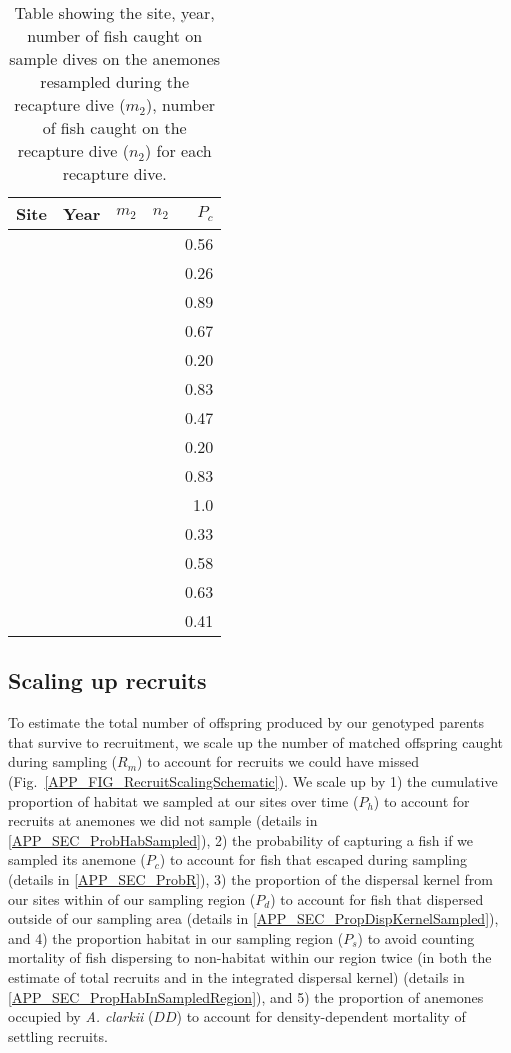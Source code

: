 \documentclass[12pt, oneside]{article}   	%
\begin{document}
\begin{table}
\begin{centering}
\begin{tabular}{|l|r|r|r|r|}
\hline
Site & Year & $m_2$ & $n_2$ & $P_c$ \\ \hline
& & & & 0.56 \\ \hline
& & & & 0.26 \\ \hline
& & & & 0.89 \\ \hline
& & & & 0.67 \\ \hline
& & & & 0.20 \\ \hline
& & & & 0.83 \\ \hline
& & & & 0.47 \\ \hline
& & & & 0.20 \\ \hline
& & & & 0.83 \\ \hline
& & & & 1.0 \\ \hline
& & & & 0.33 \\ \hline
& & & & 0.58 \\ \hline
& & & & 0.63 \\ \hline
& & & & 0.41 \\ \hline
\end{tabular}
\end{centering}
\caption{Table showing the site, year, number of fish caught on sample dives on the anemones resampled during the recapture dive ($m_2$), number of fish caught on the recapture dive ($n_2$) for each recapture dive.} \label{APP_TAB_RecapDives}
\end{table}

\subsection{Scaling up recruits}

To estimate the total number of offspring produced by our genotyped parents that survive to recruitment, we scale up the number of matched offspring caught during sampling ($R_m$) to account for recruits we could have missed (Fig.\ \ref{APP_FIG_RecruitScalingSchematic}). We scale up by 1) the cumulative proportion of habitat we sampled at our sites over time ($P_h$) to account for recruits at anemones we did not sample (details in \ref{APP_SEC_ProbHabSampled}), 2) the probability of capturing a fish if we sampled its anemone ($P_c$) to account for fish that escaped during sampling (details in \ref{APP_SEC_ProbR}), 3) the proportion of the dispersal kernel from our sites within of our sampling region ($P_d$) to account for fish that dispersed outside of our sampling area (details in \ref{APP_SEC_PropDispKernelSampled}), and 4) the proportion habitat in our sampling region ($P_s$) to avoid counting mortality of fish dispersing to non-habitat within our region twice (in both the estimate of total recruits and in the integrated dispersal kernel) (details in \ref{APP_SEC_PropHabInSampledRegion}), and 5) the proportion of anemones occupied by \textit{A. clarkii} ($DD$) to account for density-dependent mortality of settling recruits.
\end{document}
